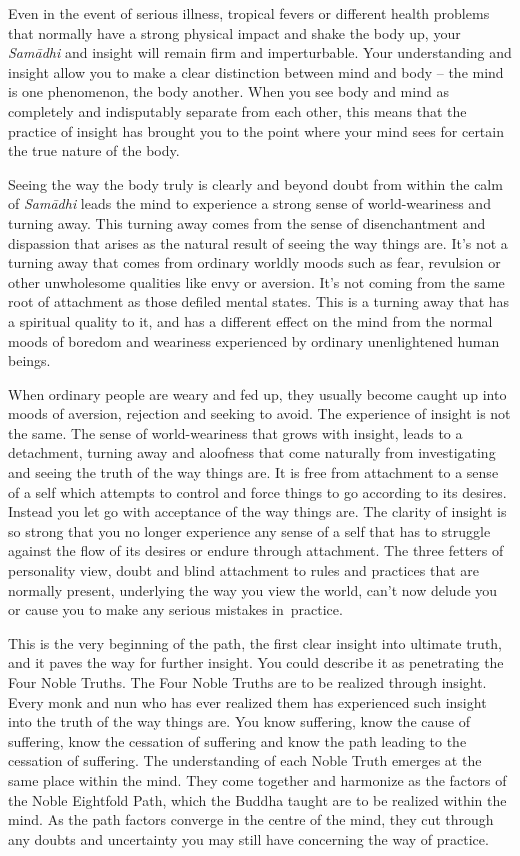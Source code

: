 Even in the event of serious illness, tropical fevers or different health problems that normally have a strong physical impact and shake the body up, your \textit{Sam\=adhi} and insight will remain firm and imperturbable. Your understanding and insight allow you to make a clear distinction between mind and body -- the mind is one phenomenon, the body another. When you see body and mind as completely and indisputably separate from each other, this means that the practice of insight has brought you to the point where your mind sees for certain the true nature of the body.

Seeing the way the body truly is clearly and beyond doubt from within the calm of \textit{Sam\=adhi} leads the mind to experience a strong sense of world-weariness and turning away. This turning away comes from the sense of disenchantment and dispassion that arises as the natural result of seeing the way things are. It's not a turning away that comes from ordinary worldly moods such as fear, revulsion or other unwholesome qualities like envy or aversion. It's not coming from the same root of attachment as those defiled mental states. This is a turning away that has a spiritual quality to it, and has a different effect on the mind from the normal moods of boredom and weariness experienced by ordinary unenlightened human beings.

When ordinary people are weary and fed up, they usually become caught up into moods of aversion, rejection and seeking to avoid. The experience of insight is not the same. The sense of world-weariness that grows with insight, leads to a detachment, turning away and aloofness that come naturally from investigating and seeing the truth of the way things are. It is free from attachment to a sense of a self which attempts to control and force things to go according to its desires. Instead you let go with acceptance of the way things are. The clarity of insight is so strong that you no longer experience any sense of a self that has to struggle against the flow of its desires or endure through attachment. The three fetters of personality view, doubt and blind attachment to rules and practices that are normally present, underlying the way you view the world, can't now delude you or cause you to make any serious mistakes in~practice.

This is the very beginning of the path, the first clear insight into ultimate truth, and it paves the way for further insight. You could describe it as penetrating the Four Noble Truths. The Four Noble Truths are to be realized through insight. Every monk and nun who has ever realized them has experienced such insight into the truth of the way things are. You know suffering, know the cause of suffering, know the cessation of suffering and know the path leading to the cessation of suffering. The understanding of each Noble Truth emerges at the same place within the mind. They come together and harmonize as the factors of the Noble Eightfold Path, which the Buddha taught are to be realized within the mind. As the path factors converge in the centre of the mind, they cut through any doubts and uncertainty you may still have concerning the way of practice.

